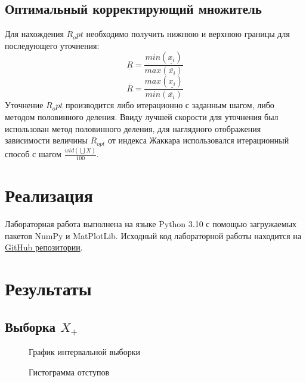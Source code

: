\documentclass[12pt,a4paper]{article}
\begin{document}
            \subsection{Оптимальный корректирующий множитель}
                Для нахождения $R_opt$ необходимо получить нижнюю и верхнюю границы для последующего уточнения:
                \begin{equation}
                    \underline{R} = \frac{min(\underline{x_i})}{max(\overline{x_i})}
                \end{equation}
                \begin{equation}
                    \overline{R} = \frac{max(\underline{x_i})}{min(\overline{x_i})}
                \end{equation}
                Уточнение $R_opt$ производится либо итерационно с заданным шагом, либо методом половинного деления. Ввиду лучшей скорости для уточнения был использован метод половинного деления, для наглядного отображения зависимости величины $R_{opt}$ от индекса Жаккара использовался итерационный способ с шагом $\frac{wid(\bigcup X)}{100}$.
	\newpage
	
	\section{Реализация}
		Лабораторная работа выполнена на языке Python 3.10 с помощью загружаемых пакетов NumPy и MatPlotLib. Исходный код лабораторной работы находится на \href{https://github.com/Drusiand/SPbSTU_Interval_Analysis.git}{GitHub репозитории}.
	\newpage
	
	\section{Результаты}
		\subsection{Выборка $X_+$}
                \begin{figure}[h!]
                        \caption{График интервальной выборки}
                \end{figure}
        	\FloatBarrier
         
                \begin{figure}[h!]                            
                        \caption{Гистограмма отступов}
                \end{figure}
        	\FloatBarrier
         
\end{document}
